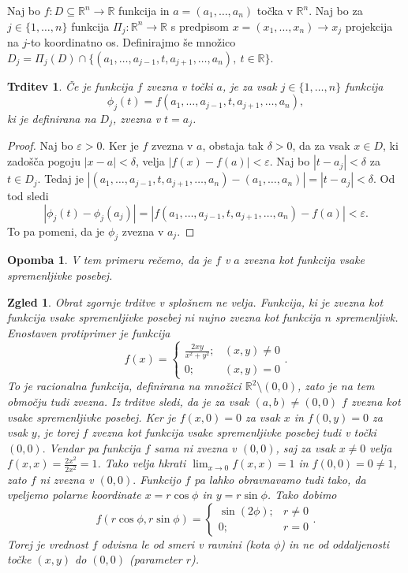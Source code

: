 \documentclass[10pt, a4paper]{article}
\newtheorem{trditev}[izr]{Trditev}
\newtheorem*{opomba}{Opomba}
\newtheorem{zgled}{Zgled}[section]
\newenvironment{noticeC}{%
  \tcolorbox[%
  notitle,
  empty,
  enhanced,  %
  breakable,
  coltext=black, 
  fontupper=\rmfamily,
  parbox=false,
  noparskip,
  sharp corners,
  boxrule=-1pt,  %
  frame hidden,
  left=7pt,  %
  right=7pt,
  top=5pt,
  bottom=5pt,
  before skip=2.5ex plus 2pt,
  after skip=2.5ex plus 2pt,
  overlay unbroken and last={%
  },
  ]}
{\endtcolorbox}
\newenvironment{dokaz}%
  {\begin{noticeC}\begin{proof}}%
  {\end{proof}\end{noticeC}}
\newcommand{\R}{\mathbb {R}}
\begin{document}
Naj bo $f: D \subseteq \R^n \rightarrow \R$ funkcija in $a = (a_1, \dots, a_n)$ točka v $\R^n$.
Naj bo za $j \in \{1, \dots, n\}$ funkcija $\Pi_j: \R^n \rightarrow \R$ s predpisom 
$x= (x_1, \dots, x_n) \rightarrow x_j$ projekcija na $j$-to koordinatno os.
Definirajmo še množico $D_j = \Pi_j (D) \cap \{(a_1, \dots, a_{j-1}, t, a_{j+1}, \dots, a_n),\ t \in \R\}.$

\begin{trditev}
    Če je funkcija $f$ zvezna v točki $a$, je za vsak $j \in \{1, \dots, n\}$ funkcija
    $$\phi_j (t) = f(a_1, \dots, a_{j-1}, t, a_{j+1}, \dots, a_n),$$ ki je definirana na $D_j$,
    zvezna v $t = a_j$.
\end{trditev}

\begin{dokaz}
    Naj bo $\varepsilon > 0$.
    Ker je $f$ zvezna v $a$, obstaja tak $\delta > 0$, da za vsak $x \in D$,
    ki zadošča pogoju $|x - a| < \delta$, velja $|f(x) - f(a)| < \varepsilon$.
    Naj bo $|t - a_j| < \delta$ za $t \in D_j$.
    Tedaj je $|(a_1, \dots, a_{j-1}, t, a_{j+1}, \dots, a_n) - (a_1, \dots, a_n)| = |t - a_j| < \delta.$
    Od tod sledi $$|\phi_j(t) - \phi_j(a_j)| = |f(a_1, \dots, a_{j-1}, t, a_{j+1}, \dots, a_n) - f(a)| < \varepsilon.$$
    To pa pomeni, da je $\phi_j$ zvezna v $a_j.$
\end{dokaz}

\begin{opomba}
    V tem primeru rečemo, da je $f$ v $a$ zvezna kot funkcija vsake spremenljivke posebej.
\end{opomba}

\begin{zgled}\label{zgl:1}
    Obrat zgornje trditve v splošnem ne velja.
    Funkcija, ki je zvezna kot funkcija vsake spremenljivke posebej ni nujno zvezna kot funkcija $n$ spremenljivk.
    Enostaven protiprimer je funkcija $$f(x) = \begin{cases}
        \frac{2xy}{x^2 + y^2} ;& (x, y) \neq 0\\
        0 ;& (x, y) = 0
    \end{cases}.$$
    To je racionalna funkcija, definirana na množici $\R^2 \setminus {(0,0)}$,
    zato je na tem območju tudi zvezna. Iz trditve sledi, da je za vsak $(a, b) \neq (0,0)$
    $f$ zvezna kot vsake spremenljivke posebej. Ker je $f(x, 0) = 0$ za vsak $x$ in $f(0, y) = 0$ za vsak $y$,
    je torej $f$ zvezna kot funkcija vsake spremenljivke posebej tudi v točki $(0,0).$
    Vendar pa funkcija $f$ sama ni zvezna v $(0,0)$, saj za vsak $x \neq 0$ velja $f(x, x) = \frac{2x^2}{2x^2} = 1$.
    Tako velja hkrati $\lim_{x \to 0} f(x,x) = 1$ in $f(0,0) = 0 \neq 1$, zato $f$ ni zvezna v $(0,0).$
    Funkcijo $f$ pa lahko obravnavamo tudi tako, da vpeljemo polarne koordinate $x = r \cos \phi$ in $y = r \sin \phi$.
    Tako dobimo $$f(r \cos \phi, r \sin \phi) = \begin{cases}
        \sin (2 \phi) ;& r \neq 0\\
        0 ;& r = 0
    \end{cases}.$$
    Torej je vrednost $f$ odvisna le od smeri v ravnini (kota $\phi$)
    in ne od oddaljenosti točke $(x, y)$ do $(0,0)$ (parameter $r$).    
\end{zgled}
\end{document}
